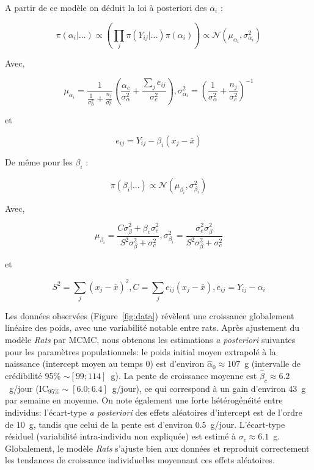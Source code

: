 \documentclass[12pt]{article}
\begin{document}
A partir de ce modèle on déduit la loi à posteriori des $\alpha_i$ :

$$ \pi(\alpha_i | ...) \propto (\prod_{j} \pi(Y_{ij} | ...) \pi(\alpha_i)) \propto \mathcal{N}(\mu_{\alpha_i}, \sigma_{\alpha_i}^2) $$

Avec,

$$ \mu_{\alpha_i} = \frac{1}{\frac{1}{\sigma_{\alpha}^2} + \frac{n_j}{\sigma_{c}^2}}(\frac{\alpha_c}{\sigma_{\alpha}^2} + \frac{\sum_{j}e_{ij}}{\sigma_{c}^2}) , \sigma_{\alpha_i}^2 = (\frac{1}{\sigma_{\alpha}^2} + \frac{n_j}{\sigma_{c}^2})^{-1}$$

et

$$ e_{ij} = Y_{ij} - \beta_i(x_j - \bar{x})$$

De même pour les $\beta_i$ :

$$ \pi(\beta_i | ...) \propto \mathcal{N}(\mu_{\beta_i}, \sigma_{\beta_i}^2) $$

Avec,

$$ \mu_{\beta_i} = \frac{C\sigma_{\beta}^2 + \beta_c \sigma_{c}^2}{S^2 \sigma_{\beta}^2 + \sigma_{c}^2}, \sigma_{\beta_i}^2 = \frac{\sigma_{c}^2 \sigma_{\beta}^2}{S^2 \sigma_{\beta}^2 + \sigma_{c}^2}$$

et

$$ S^2 = \sum_{j}(x_j - \bar{x})^2, C =  \sum_{j}e_{ij}(x_j - \bar{x}), e_{ij} = Y_{ij} - \alpha_i$$

Les données observées (Figure~\ref{fig:data}) révèlent une croissance globalement linéaire des poids, avec une variabilité notable entre rats. Après ajustement du modèle \textit{Rats} par MCMC, nous obtenons les estimations \emph{a posteriori} suivantes pour les paramètres populationnels: le poids initial moyen extrapolé à la naissance (intercept moyen au temps $0$) est d'environ $\hat{\alpha}_0 \approx 107$~g (intervalle de crédibilité 95\% $\sim[99;114]$~g). La pente de croissance moyenne est $\hat{\beta}_c \approx 6.2$~g/jour (IC$_{95\%}\sim[6.0;6.4]$~g/jour), ce qui correspond à un gain d'environ 43~g par semaine en moyenne. On note également une forte hétérogénéité entre individus: l'écart-type \emph{a posteriori} des effets aléatoires d'intercept est de l'ordre de $10$~g, tandis que celui de la pente est d'environ $0.5$~g/jour. L'écart-type résiduel (variabilité intra-individu non expliquée) est estimé à $\sigma_c \approx 6.1$~g. Globalement, le modèle \textit{Rats} s'ajuste bien aux données et reproduit correctement les tendances de croissance individuelles moyennant ces effets aléatoires.
\end{document}
